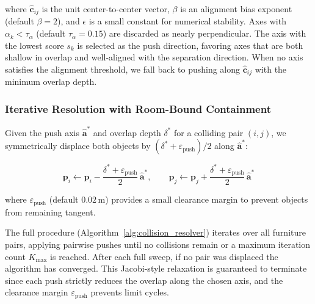 \noindent where $\hat{\mathbf{c}}_{ij}$ is the unit center-to-center vector, $\beta$ is an alignment bias exponent (default $\beta = 2$), and $\epsilon$ is a small constant for numerical stability.
Axes with $\alpha_k < \tau_{\alpha}$ (default $\tau_{\alpha} = 0.15$) are discarded as nearly perpendicular.
The axis with the lowest score $s_k$ is selected as the push direction, favoring axes that are both shallow in overlap and well-aligned with the separation direction.
When no axis satisfies the alignment threshold, we fall back to pushing along $\hat{\mathbf{c}}_{ij}$ with the minimum overlap depth.

\subsubsection{Iterative Resolution with Room-Bound Containment}
\label{sec:method:iterative}

Given the push axis $\hat{\mathbf{a}}^*$ and overlap depth $\delta^*$ for a colliding pair $(i, j)$, we symmetrically displace both objects by $(\delta^* + \varepsilon_{\mathrm{push}}) / 2$ along $\hat{\mathbf{a}}^*$:

\begin{equation}
\mathbf{p}_i \gets \mathbf{p}_i - \frac{\delta^* + \varepsilon_{\mathrm{push}}}{2}\, \hat{\mathbf{a}}^*, \qquad
\mathbf{p}_j \gets \mathbf{p}_j + \frac{\delta^* + \varepsilon_{\mathrm{push}}}{2}\, \hat{\mathbf{a}}^*
\label{eq:push}
\end{equation}

\noindent where $\varepsilon_{\mathrm{push}}$ (default $0.02\,\text{m}$) provides a small clearance margin to prevent objects from remaining tangent.

The full procedure (Algorithm~\ref{alg:collision_resolver}) iterates over all furniture pairs, applying pairwise pushes until no collisions remain or a maximum iteration count $K_{\max}$ is reached.
After each full sweep, if no pair was displaced the algorithm has converged.
This Jacobi-style relaxation is guaranteed to terminate since each push strictly reduces the overlap along the chosen axis, and the clearance margin $\varepsilon_{\mathrm{push}}$ prevents limit cycles.

